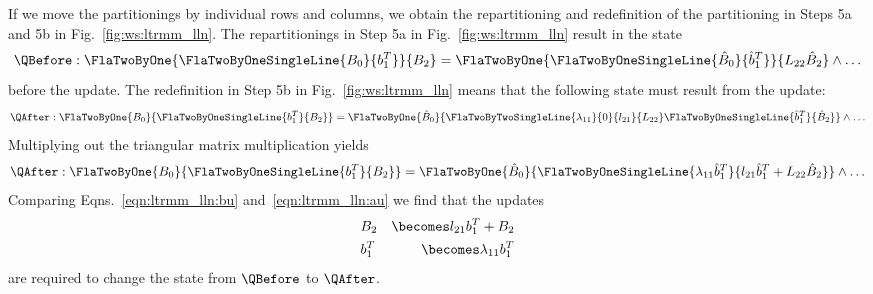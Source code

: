 If we move the partitionings by individual rows and columns, we obtain
the repartitioning and redefinition of the partitioning in Steps 5a
and 5b in Fig.~\ref{fig:ws:ltrmm_lln}.  The repartitionings in Step 5a
in Fig.~\ref{fig:ws:ltrmm_lln} result in the state
\begin{equation}
\label{eqn:ltrmm_lln:bu}
\QBefore: 
\FlaTwoByOne{ 
\FlaTwoByOneSingleLine{ B_0 }{ b_1^T }
}
{
B_2
} =
\FlaTwoByOne{ 
\FlaTwoByOneSingleLine{ \hat{B}_0 }{ \hat{b}_1^T }
}
{
L_{22} \hat{B}_2
}
\wedge \ldots
\end{equation}
before the update.  The redefinition in Step 5b in
Fig.~\ref{fig:ws:ltrmm_lln} means that the following state must result
from the update:
\[
\QAfter: 
\FlaTwoByOne{ 
B_0
}
{
\FlaTwoByOneSingleLine{ b_1^T }{ B_2 }
} =
\FlaTwoByOne{ 
\hat{B}_0
}
{
\FlaTwoByTwoSingleLine{ \lambda_{11} }{ 0 }
                      { l_{21} }{ L_{22} }
\FlaTwoByOneSingleLine{ \hat{b}_1^T }{ \hat{B}_2 }
}
\wedge \ldots
\]
Multiplying out the triangular matrix multiplication yields
\begin{equation}
\label{eqn:ltrmm_lln:au}
\QAfter: 
\FlaTwoByOne{ 
B_0
}
{
\FlaTwoByOneSingleLine{ b_1^T }{ B_2 }
} =
\FlaTwoByOne{ 
\hat{B}_0
}
{
\FlaTwoByOneSingleLine{ \lambda_{11} \hat{b}_1^T }{ l_{21} \hat{b}_1^T + L_{22} \hat{B}_2 }
}
\wedge \ldots
\end{equation}
Comparing Eqns.~\ref{eqn:ltrmm_lln:bu} and~\ref{eqn:ltrmm_lln:au} we
find that the updates
\begin{eqnarray*}
& B_2 & \becomes l_{21} b_1^T + B_2 \\
& b_1^T & \becomes \lambda_{11} b_1^T 
\end{eqnarray*}
are required to change the state from $ \QBefore $ to $ \QAfter $.


\renewcommand{\operation}{B \becomes L B}

\renewcommand{\precondition}{B = \hat{B} \wedge \LowTr( L ) \wedge \ColDim( L )=\RowDim( B )}

\renewcommand{\postcondition}{B = L \hat{B}}

\renewcommand{\invariant}{
\FlaTwoByOne{ B_T}{B_B} =
\FlaTwoByOne{ \hat{B}_T }
            { L_{BR} \hat{B}_B }
\wedge
\ldots
}

\renewcommand{\guard}{ \neg \SameSize( L, L_{BR} ) }

